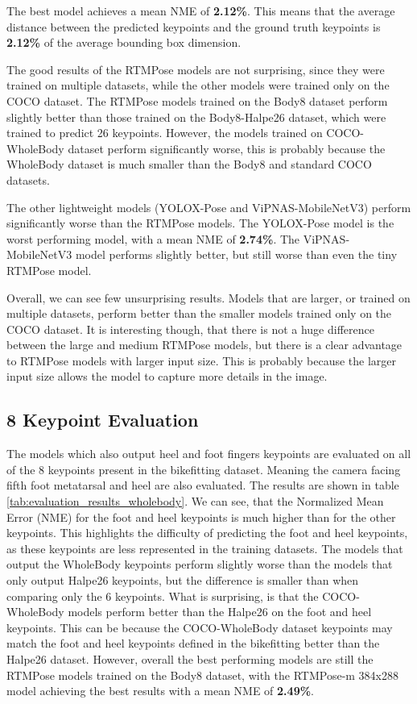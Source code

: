 The best model achieves a mean NME of \textbf{2.12\%}. This means that the average distance between the predicted keypoints and the ground truth keypoints is \textbf{2.12\%} of the average bounding box dimension.

The good results of the RTMPose models are not surprising, since they were trained on multiple datasets, while the other models were trained only on the COCO dataset. The RTMPose models trained on the Body8 dataset perform slightly better than those trained on the Body8-Halpe26 dataset, which were trained to predict 26 keypoints. However, the models trained on COCO-WholeBody dataset perform significantly worse, this is probably because the WholeBody dataset is much smaller than the Body8 and standard COCO datasets.

The other lightweight models (YOLOX-Pose and ViPNAS-MobileNetV3) perform significantly worse than the RTMPose models. The YOLOX-Pose model is the worst performing model, with a mean NME of \textbf{2.74\%}. The ViPNAS-MobileNetV3 model performs slightly better, but still worse than even the tiny RTMPose model.

Overall, we can see few unsurprising results. Models that are larger, or trained on multiple datasets, perform better than the smaller models trained only on the COCO dataset. It is interesting though, that there is not a huge difference between the large and medium RTMPose models, but there is a clear advantage to RTMPose models with larger input size. This is probably because the larger input size allows the model to capture more details in the image.

\subsection{8 Keypoint Evaluation}
The models which also output heel and foot fingers keypoints are evaluated on all of the 8 keypoints present in the bikefitting dataset. Meaning the camera facing fifth foot metatarsal and heel are also evaluated. The results are shown in table \ref{tab:evaluation_results_wholebody}. We can see, that the Normalized Mean Error (NME) for the foot and heel keypoints is much higher than for the other keypoints. This highlights the difficulty of predicting the foot and heel keypoints, as these keypoints are less represented in the training datasets. The models that output the WholeBody keypoints perform slightly worse than the models that only output Halpe26 keypoints, but the difference is smaller than when comparing only the 6 keypoints. What is surprising, is that the COCO-WholeBody models perform better than the Halpe26 on the foot and heel keypoints. This can be because the COCO-WholeBody dataset keypoints may match the foot and heel keypoints defined in the bikefitting better than the Halpe26 dataset. However, overall the best performing models are still the RTMPose models trained on the Body8 dataset, with the RTMPose-m 384x288 model achieving the best results with a mean NME of \textbf{2.49\%}.

